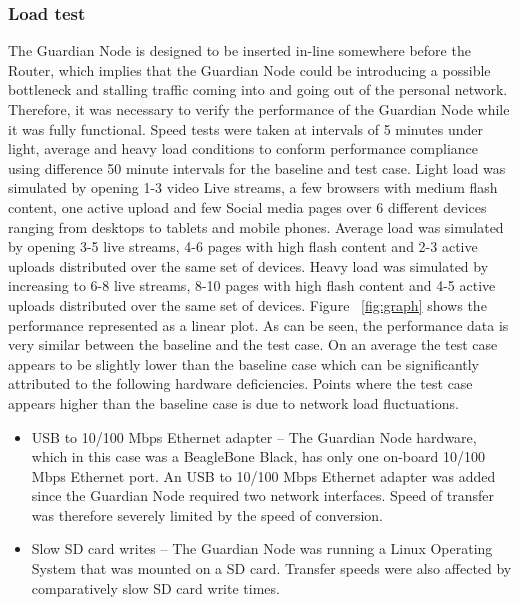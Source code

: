 \subsubsection{Load test}
\label{sec:eval:loadtest}
The Guardian Node is designed to be inserted in-line somewhere before the Router, which implies that the Guardian Node could be introducing a possible bottleneck and stalling traffic coming into and going out of the personal network. Therefore, it was necessary to verify the performance of the Guardian Node while it was fully functional. Speed tests were taken at intervals of 5 minutes under light, average and heavy load conditions to conform performance compliance using difference 50 minute intervals for the baseline and test case. Light load was simulated by opening 1-3 video Live streams, a few browsers with medium flash content, one active upload and few Social media pages over 6 different devices ranging from desktops to tablets and mobile phones. Average load was simulated by opening 3-5 live streams, 4-6 pages with high flash content and 2-3 active uploads distributed over the same set of devices. Heavy load was simulated by increasing to 6-8 live streams, 8-10 pages with high flash content and 4-5 active uploads distributed over the same set of devices. Figure ~\ref{fig:graph} shows the performance represented as a linear plot. As can be seen, the performance data is very similar between the baseline and the test case. On an average the test case appears to be slightly lower than the baseline case which can be significantly attributed to the following hardware deficiencies. Points where the test case appears higher than the baseline case is due to network load fluctuations.
\begin{itemize}
    \item USB to 10/100 Mbps Ethernet adapter --
    The Guardian Node hardware, which in this case was a BeagleBone Black, has only one on-board 10/100 Mbps Ethernet port. An USB to 10/100 Mbps Ethernet adapter was added since the Guardian Node required two network interfaces. Speed of transfer was therefore severely limited by the speed of conversion.
    \item Slow SD card writes --
    The Guardian Node was running a Linux Operating System that was mounted on a SD card. Transfer speeds were also affected by comparatively slow SD card write times.
\end{itemize}


